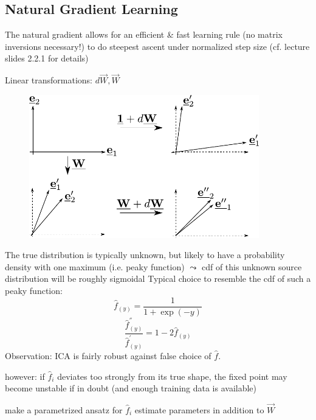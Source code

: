 

\subsection{Natural Gradient Learning}

\begin{frame}{\subsecname}

The natural gradient allows for an efficient \& fast learning rule (no matrix inversions
  necessary!) to do steepest ascent under normalized step size (cf. lecture slides 2.2.1 for details)

Linear transformations: $d \vec{W}, \vec{W}$
\begin{figure}[h]
  \centering
\includegraphics[width=10cm]{img/section2_fig18}  
  \label{fig:NatGrad}
\end{figure}

\end{frame}


\newpage

The true distribution is typically unknown, 
but likely to have a probability density with one maximum (i.e. peaky function)
$\leadsto$ cdf of this unknown source distribution will be roughly sigmoidal
Typical choice to resemble the cdf of such a peaky function:
\begin{equation} \tag{logistic function}
	\widehat{f}_{(y)} = \frac{1}{1 + \exp(-y)}
\end{equation}
\begin{equation}
	\frac{\widehat{f}_{(y)}^{''}}{\widehat{f}_{(y)}^{'}}
	= 1 - 2 \widehat{f}_{(y)}
\end{equation}
Observation: ICA is fairly robust against false choice of $\widehat{f}$.

\begin{itemize}
	\itR however: if $\widehat{f}_i$ deviates too strongly from its true
		shape, the fixed point may become unstable
	\itR if in doubt (and enough training data is available)
	\begin{itemize}
		\itl make a parametrized ansatz for $\widehat{f}_i$
		\itl estimate parameters in addition to $\vec{W}$
	\end{itemize}
\end{itemize}
